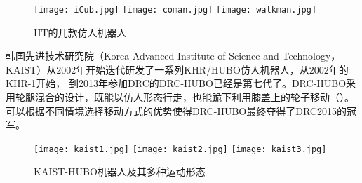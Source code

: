 \begin{figure}[htbp]
    \centering
        {%
            \texttt{[image: iCub.jpg]}}
        {%
            \texttt{[image: coman.jpg]}}
        {%
            \texttt{[image: walkman.jpg]}}            
    \caption{IIT的几款仿人机器人\label{fig:iit_biped}}
\end{figure}
韩国先进技术研究院（Korea Advanced Institute of Science and Technology，KAIST）从2002年开始迭代研发了一系列KHR/HUBO仿人机器人，从2002年的KHR-1开始，
到2013年参加DRC的DRC-HUBO已经是第七代了。DRC-HUBO采用轮腿混合的设计，既能以仿人形态行走，也能跪下利用膝盖上的轮子移动\cite{zucker2015general}（）。
可以根据不同情境选择移动方式的优势使得DRC-HUBO最终夺得了DRC2015的冠军。
\begin{figure}[htbp]
    \centering
    \texttt{[image: kaist1.jpg]}
    \texttt{[image: kaist2.jpg]}
    \texttt{[image: kaist3.jpg]}
    \caption{\label{fig:kaist_hubo}KAIST-HUBO机器人及其多种运动形态}
\end{figure}
